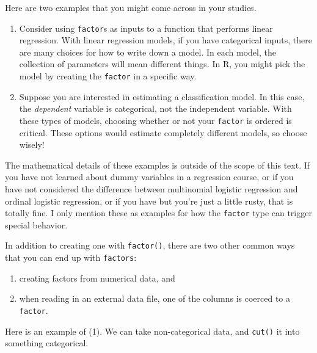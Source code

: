 \documentclass[
  12pt,
]{krantz}
\providecommand{\tightlist}{%
  \setlength{\itemsep}{0pt}\setlength{\parskip}{0pt}}
\begin{document}
Here are two examples that you might come across in your studies.

\begin{enumerate}
\def\labelenumi{\arabic{enumi}.}
\item
  Consider using \texttt{factor}s as inputs to a function that performs linear regression. With linear regression models, if you have categorical inputs, there are many choices for how to write down a model. In each model, the collection of parameters will mean different things. In R, you might pick the model by creating the \texttt{factor} in a specific way.
\item
  Suppose you are interested in estimating a classification model. In this case, the \emph{dependent} variable is categorical, not the independent variable. With these types of models, choosing whether or not your \texttt{factor} is ordered is critical. These options would estimate completely different models, so choose wisely!
\end{enumerate}

The mathematical details of these examples is outside of the scope of this text. If you have not learned about dummy variables in a regression course, or if you have not considered the difference between multinomial logistic regression and ordinal logistic regression, or if you have but you're just a little rusty, that is totally fine. I only mention these as examples for how the \texttt{factor} type can trigger special behavior.

In addition to creating one with \texttt{factor()}, there are two other common ways that you can end up with \texttt{factors}:

\begin{enumerate}
\def\labelenumi{\arabic{enumi}.}
\tightlist
\item
  creating factors from numerical data, and
\item
  when reading in an external data file, one of the columns is coerced to a \texttt{factor}.
\end{enumerate}

Here is an example of (1). We can take non-categorical data, and \texttt{cut()} it into something categorical.
\end{document}
